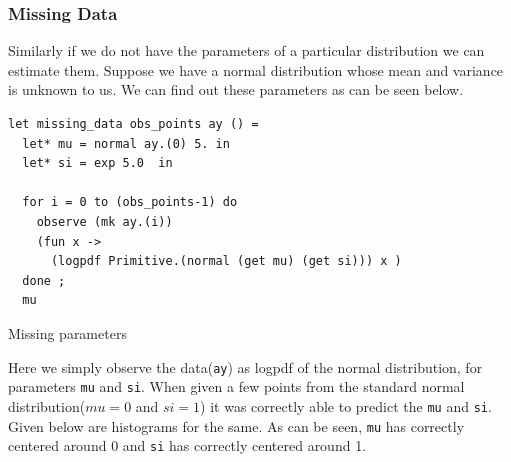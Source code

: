 \documentclass[a4paper,11pt]{article}
\theoremstyle{mytheor}
\begin{document}
        \subsubsection{Missing Data}
        
        Similarly if we do not have the parameters of a particular distribution we can estimate them. Suppose we have a normal distribution whose mean and variance is unknown to us. We can find out these parameters as can be seen below.
\begin{listing}[H]\centering
\begin{verbatim}
let missing_data obs_points ay () = 
  let* mu = normal ay.(0) 5. in 
  let* si = exp 5.0  in 

  for i = 0 to (obs_points-1) do 
    observe (mk ay.(i)) 
    (fun x -> 
      (logpdf Primitive.(normal (get mu) (get si))) x )
  done ;
  mu
\end{verbatim}
\caption{Missing parameters}
\end{listing}        
    Here we simply observe the data(\lstinline{ay}) as logpdf of the normal distribution, for parameters \lstinline{mu} and \lstinline{si}.  When given a few points from the standard normal distribution($mu = 0$ and $si = 1$) it was correctly able to predict the \lstinline{mu} and \lstinline{si}. Given below are histograms for the same. As can be seen, \lstinline{mu} has correctly centered around 0 and \lstinline{si} has correctly centered around 1. 
    
\end{document}
